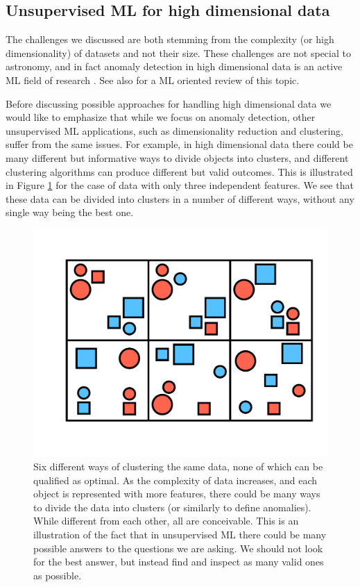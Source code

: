 \documentclass[fleqn,usenatbib]{mnras}
\begin{document}
{\subsection{Unsupervised ML for high dimensional data}
\label{sec:highd}

The challenges  we discussed are both stemming from  the complexity (or high dimensionality) of datasets and not their size. These challenges  are not special to astronomy, and in fact anomaly detection in high dimensional data is   an active ML field of research   \citep[][listing a few examples]{aggarwal01, zhang04a, muller08, kriegel09a, muller10, keller12}.  See also \citet{zimek12} for a ML oriented review of this topic. 


Before discussing possible approaches for handling high dimensional data we would like to emphasize  that while we  focus on anomaly detection,  other unsupervised ML applications, such as dimensionality reduction and clustering, suffer from  the same issues. For example, in high dimensional data there could be many different but informative ways to divide  objects into clusters, and different clustering algorithms can produce different but valid outcomes. This is illustrated in Figure \ref{fig:clstr} for the case of data with only three independent features. We see that these data can be divided into clusters in a number of different ways, without any single way being the best one.


\begin{figure}
  \begin{center}
  \includegraphics[width=\columnwidth]{clstr_v4.pdf}
  \caption{Six different  ways  of clustering the same data, none of which can be qualified as optimal. As the complexity of data increases, and each object is represented with more features, there could be many ways to divide the data into clusters (or similarly to define anomalies). While different from each other, all are conceivable. This is an illustration of the fact that in unsupervised ML there could be many possible answers to the questions we are asking. We should not look for the best answer, but  instead find and inspect as many valid ones as possible.} \label{fig:clstr}
  \end{center}
\end{figure}



}
\end{document}
